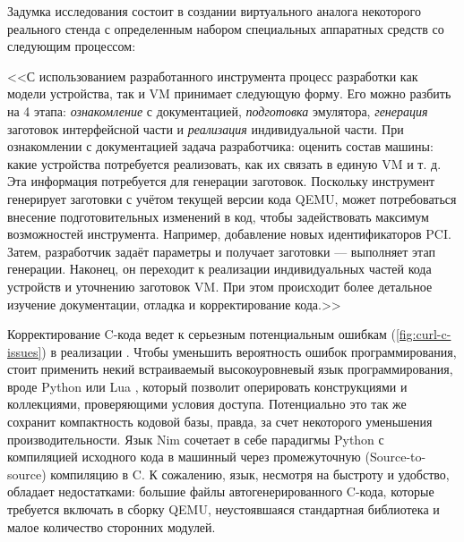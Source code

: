 Задумка исследования \cite{imposters} состоит в создании виртуального аналога некоторого реального стенда
с определенным набором специальных аппаратных средств со следующим процессом:

<<С использованием разработанного инструмента процесс разработки как модели устройства,
так и VM принимает следующую форму.
Его можно разбить на 4 этапа: \textit{ознакомление} с документацией, \textit{подготовка} эмулятора,
\textit{генерация} заготовок интерфейсной части и \textit{реализация} индивидуальной части.
При ознакомлении с документацией задача разработчика: оценить состав
машины: какие устройства потребуется реализовать, как их связать в единую
VM и т. д. Эта информация потребуется для генерации заготовок. Поскольку
инструмент генерирует заготовки с учётом текущей версии кода QEMU,
может потребоваться внесение подготовительных изменений в код, чтобы
задействовать максимум возможностей инструмента. Например, добавление
новых идентификаторов PCI. Затем, разработчик задаёт параметры и получает
заготовки — выполняет этап генерации. Наконец, он переходит к реализации
индивидуальных частей кода устройств и уточнению заготовок VM. При этом
происходит более детальное изучение документации, отладка и
корректирование кода.>>

Корректирование C-кода ведет к серьезным потенциальным ошибкам (\cref{fig:curl-c-issues}) в реализации \cite{qemu-c-style}.
Чтобы уменьшить вероятность ошибок программирования, стоит применить некий встраиваемый
высокоуровневый язык программирования, вроде Python \cite{python} или Lua \cite{lua},
который позволит оперировать конструкциями и коллекциями, проверяющими условия доступа.
Потенциально это так же сохранит компактность кодовой базы,
правда, за счет некоторого уменьшения производительности. \label{better-logic}
Язык Nim \cite{nim} сочетает в себе парадигмы Python с компиляцией исходного кода в машинный через
промежуточную (Source-to-source) компиляцию в C. К сожалению, язык, несмотря на быстроту и удобство, обладает
недостатками: большие файлы автогенерированного C-кода, которые требуется включать в сборку QEMU,
неустоявшаяся стандартная библиотека и малое количество сторонних модулей.

